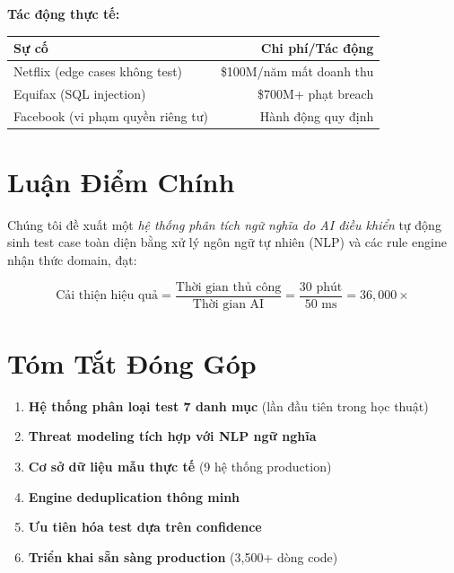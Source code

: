 \documentclass[12pt,oneside]{report}
\begin{document}
\textbf{Tác động thực tế:}
\begin{table}[H]
\centering
\begin{tabular}{|l|r|}
\hline
\textbf{Sự cố} & \textbf{Chi phí/Tác động} \\
\hline
Netflix (edge cases không test) & \$100M/năm mất doanh thu \\
Equifax (SQL injection) & \$700M+ phạt breach \\
Facebook (vi phạm quyền riêng tư) & Hành động quy định \\
\hline
\end{tabular}
\end{table}

\section{Luận Điểm Chính}

Chúng tôi đề xuất một \textit{hệ thống phân tích ngữ nghĩa do AI điều khiển} 
tự động sinh test case toàn diện bằng xử lý ngôn ngữ tự nhiên (NLP) và 
các rule engine nhận thức domain, đạt:

\begin{equation}
\text{Cải thiện hiệu quả} = \frac{\text{Thời gian thủ công}}{\text{Thời gian AI}} = \frac{30 \text{ phút}}{50 \text{ ms}} = 36,000\times
\end{equation}

\section{Tóm Tắt Đóng Góp}

\begin{enumerate}
    \item \textbf{Hệ thống phân loại test 7 danh mục} (lần đầu tiên trong học thuật)
    \item \textbf{Threat modeling tích hợp với NLP ngữ nghĩa}
    \item \textbf{Cơ sở dữ liệu mẫu thực tế} (9 hệ thống production)
    \item \textbf{Engine deduplication thông minh}
    \item \textbf{Ưu tiên hóa test dựa trên confidence}
    \item \textbf{Triển khai sẵn sàng production} (3,500+ dòng code)
\end{enumerate}

\end{document}
